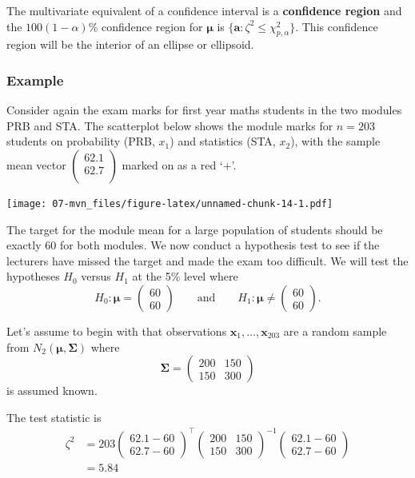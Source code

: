 \documentclass[
]{book}
\theoremstyle{definition}
\theoremstyle{definition}
\theoremstyle{definition}
\theoremstyle{definition}
\theoremstyle{remark}
\begin{document}
The multivariate equivalent of a confidence interval is a \textbf{confidence region} and the \(100(1-\alpha)\)\% confidence region for \({\boldsymbol{\mu}}\) is \(\{ \mathbf a: \zeta^2 \leq \chi^2_{p,\alpha} \}\).
This confidence region will be the interior of an ellipse or ellipsoid.

\hypertarget{example-6}{%
\subsubsection*{Example}\label{example-6}}

Consider again the exam marks for first year maths students in the two modules PRB and STA. The scatterplot below shows the module marks for \(n=203\) students on probability (PRB, \(x_1\)) and statistics (STA, \(x_2\)), with the sample mean vector \(\begin{pmatrix}62.1 \\62.7 \\\end{pmatrix}\) marked on as a red `+'.

\texttt{[image: 07-mvn\_files/figure-latex/unnamed-chunk-14-1.pdf]}

The target for the module mean for a large population of students should be exactly 60 for both modules. We now conduct a hypothesis test to see if the lecturers have missed the target and made the exam too difficult. We will test the hypotheses \(H_0\) versus \(H_1\) at the 5\% level where
\[
H_0: {\boldsymbol{\mu}}= \begin{pmatrix} 60 \\ 60 \end{pmatrix} \qquad \text{and} \qquad H_1: {\boldsymbol{\mu}}\neq \begin{pmatrix} 60 \\ 60 \end{pmatrix}.
\]

Let's assume to begin with that observations \(\mathbf x_1,\ldots,\mathbf x_{203}\) are a random sample from \(N_2({\boldsymbol{\mu}},\boldsymbol{\Sigma})\) where
\[
\boldsymbol{\Sigma}= \begin{pmatrix} 200 & 150 \\ 150 & 300 \end{pmatrix}
\]
is assumed known.

The test statistic is
\begin{align*}
\zeta^2 &= 203 \begin{pmatrix} 62.1 - 60 \\ 62.7 - 60 \end{pmatrix}^\top \begin{pmatrix} 200 & 150 \\ 150 & 300 \end{pmatrix}^{-1} \begin{pmatrix} 62.1 - 60 \\ 62.7 - 60 \end{pmatrix}\\
&=5.84
\end{align*}
\end{document}
